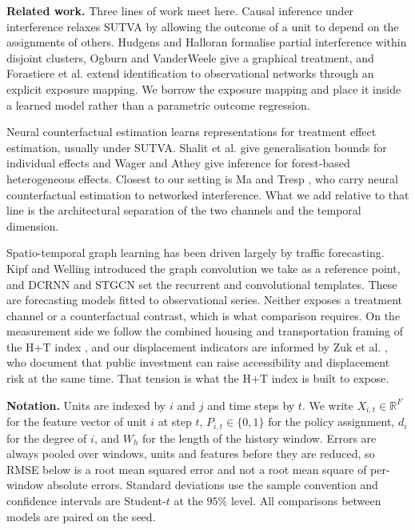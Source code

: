 \documentclass[journal]{IEEEtran}
\begin{document}
\textbf{Related work.} Three lines of work meet here. Causal inference under
interference relaxes SUTVA by allowing the outcome of a unit to depend on the
assignments of others. Hudgens and Halloran \cite{hudgens2008} formalise partial
interference within disjoint clusters, Ogburn and VanderWeele \cite{ogburn2014}
give a graphical treatment, and Forastiere et al. \cite{forastiere2021} extend
identification to observational networks through an explicit exposure mapping.
We borrow the exposure mapping and place it inside a learned model rather than a
parametric outcome regression.

Neural counterfactual estimation learns representations for treatment effect
estimation, usually under SUTVA. Shalit et al. \cite{shalit2017cfr} give
generalisation bounds for individual effects and Wager and Athey
\cite{wager2018causalforest} give inference for forest-based heterogeneous
effects. Closest to our setting is Ma and Tresp \cite{ma2021netdeconf}, who
carry neural counterfactual estimation to networked interference. What we add
relative to that line is the architectural separation of the two channels and
the temporal dimension.

Spatio-temporal graph learning has been driven largely by traffic forecasting.
Kipf and Welling \cite{kipf2017gcn} introduced the graph convolution we take as
a reference point, and DCRNN \cite{li2018dcrnn} and STGCN \cite{yu2018stgcn} set
the recurrent and convolutional templates. These are forecasting models fitted
to observational series. Neither exposes a treatment channel or a counterfactual
contrast, which is what comparison requires. On the measurement side we follow
the combined housing and transportation framing of the H$+$T index
\cite{cnt2023ht}, and our displacement indicators are informed by Zuk et al.
\cite{zuk2018gentrification}, who document that public investment can raise
accessibility and displacement risk at the same time. That tension is what the
H$+$T index is built to expose.

\textbf{Notation.} Units are indexed by $i$ and $j$ and time steps by $t$. We
write $X_{i,t} \in \mathbb{R}^{F}$ for the feature vector of unit $i$ at step
$t$, $P_{i,t} \in \{0,1\}$ for the policy assignment, $d_i$ for the degree of
$i$, and $W_h$ for the length of the history window. Errors are always pooled
over windows, units and features before they are reduced, so RMSE below is a
root mean squared error and not a root mean square of per-window absolute
errors. Standard deviations use the sample convention and confidence intervals
are Student-$t$ at the $95\%$ level. All comparisons between models are paired
on the seed.
\end{document}
